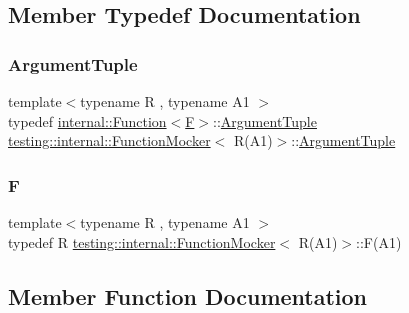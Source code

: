 \subsection{Member Typedef Documentation}
\mbox{\label{classtesting_1_1internal_1_1FunctionMocker_3_01R_07A1_08_4_aacec6412ac4343c071d7dfe965558b0b}} 
\subsubsection{\texorpdfstring{ArgumentTuple}{ArgumentTuple}}
{\footnotesize\ttfamily template$<$typename R , typename A1 $>$ \\
typedef \mbox{\hyperlink{structtesting_1_1internal_1_1Function}{internal\+::\+Function}}$<$\mbox{\hyperlink{classtesting_1_1internal_1_1FunctionMocker_3_01R_07A1_08_4_ada54286442ab14a18c2308cef748848f}{F}}$>$\+::\mbox{\hyperlink{classtesting_1_1internal_1_1FunctionMocker_3_01R_07A1_08_4_aacec6412ac4343c071d7dfe965558b0b}{Argument\+Tuple}} \mbox{\hyperlink{classtesting_1_1internal_1_1FunctionMocker}{testing\+::internal\+::\+Function\+Mocker}}$<$ R(A1)$>$\+::\mbox{\hyperlink{classtesting_1_1internal_1_1FunctionMocker_3_01R_07A1_08_4_aacec6412ac4343c071d7dfe965558b0b}{Argument\+Tuple}}}

\mbox{\label{classtesting_1_1internal_1_1FunctionMocker_3_01R_07A1_08_4_ada54286442ab14a18c2308cef748848f}} 
\subsubsection{\texorpdfstring{F}{F}}
{\footnotesize\ttfamily template$<$typename R , typename A1 $>$ \\
typedef R \mbox{\hyperlink{classtesting_1_1internal_1_1FunctionMocker}{testing\+::internal\+::\+Function\+Mocker}}$<$ R(A1)$>$\+::F(A1)}



\subsection{Member Function Documentation}
\mbox{\label{classtesting_1_1internal_1_1FunctionMocker_3_01R_07A1_08_4_a4a58d37902572c8136d999c5008dce1a}} 
